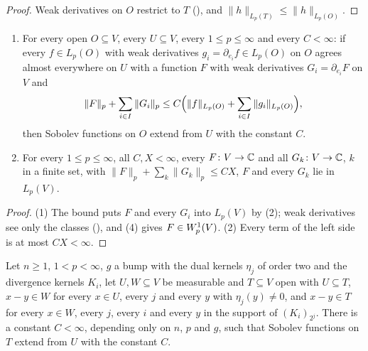 \begin{proof}
\leanok
Weak derivatives on $O$ restrict to $T$ (), and
$\|h\|_{L_p(T)} \leq \|h\|_{L_p(O)}$.
\end{proof}

\begin{lemma}
\label{lem:extends-sobolev-of-bounds}
\leanok
{}
\begin{enumerate}
  \item For every open $O \subseteq V$, every $U \subseteq V$, every $1 \leq p \leq \infty$ and
    every $C < \infty$: if every $f \in L_p(O)$ with weak derivatives
    $g_i = \partial_{e_i} f \in L_p(O)$ on $O$ agrees almost everywhere on $U$ with a function $F$
    with weak derivatives $G_i = \partial_{e_i} F$ on $V$ and
    \[
      \|F\|_p + \sum_{i \in I} \|G_i\|_p \leq C \Bigl(\|f\|_{L_p(O)} + \sum_{i \in I}
      \|g_i\|_{L_p(O)}\Bigr) ,
    \]
    then Sobolev functions on $O$ extend from $U$ with the constant $C$.
  \item For every $1 \leq p \leq \infty$, all $C, X < \infty$, every $F \colon V \to \mathbb{C}$ and all
    $G_k \colon V \to \mathbb{C}$, $k$ in a finite set, with
    $\|F\|_p + \sum_k \|G_k\|_p \leq C X$, $F$ and every $G_k$ lie in $L_p(V)$.
\end{enumerate}
\end{lemma}

\begin{proof}
\leanok
(1) The bound puts $F$ and every $G_i$ into $L_p(V)$ by (2); weak derivatives see only the
classes (), and  (4)
gives $F \in W^{1}_{p}(V)$. (2) Every term of the left side is at most $C X < \infty$.
\end{proof}

\begin{theorem}
\label{thm:one-patch-extension}
\leanok
{}
Let $n \geq 1$, $1 < p < \infty$, $g$ a bump with the dual kernels $\eta_j$ of order two and the
divergence kernels $K_i$, let $U, W \subseteq V$ be measurable and $T \subseteq V$ open with
$U \subseteq T$, $x - y \in W$ for every $x \in U$, every $j$ and every $y$ with
$\eta_j(y) \neq 0$, and $x - y \in T$ for every $x \in W$, every $j$, every $i$ and every $y$ in
the support of $(K_i)_{2^j}$. There is a constant $C < \infty$, depending only on $n$, $p$ and
$g$, such that Sobolev functions on $T$ extend from $U$ with the constant $C$.
\end{theorem}

